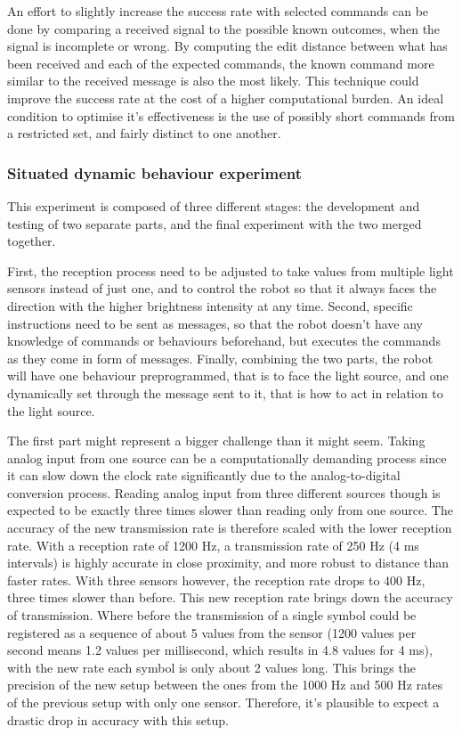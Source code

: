 An effort to slightly increase the success rate with selected commands can be done by comparing a received signal to the possible known outcomes, when the signal is incomplete or wrong.
By computing the edit distance between what has been received and each of the expected commands, the known command more similar to the received message is also the most likely.
This technique could improve the success rate at the cost of a higher computational burden.
An ideal condition to optimise it's effectiveness is the use of possibly short commands from a restricted set, and fairly distinct to one another.

\subsubsection{Situated dynamic behaviour experiment}
This experiment is composed of three different stages: the development and testing of two separate parts, and the final experiment with the two merged together.

First, the reception process need to be adjusted to take values from multiple light sensors instead of just one, and to control the robot so that it always faces the direction with the higher brightness intensity at any time.
Second, specific instructions need to be sent as messages, so that the robot doesn't have any knowledge of commands or behaviours beforehand, but executes the commands as they come in form of messages.
Finally, combining the two parts, the robot will have one behaviour preprogrammed, that is to face the light source, and one dynamically set through the message sent to it, that is how to act in relation to the light source.

The first part might represent a bigger challenge than it might seem.
Taking analog input from one source can be a computationally demanding process since it can slow down the clock rate significantly due to the analog-to-digital conversion process.
Reading analog input from three different sources though is expected to be exactly three times slower than reading only from one source.
The accuracy of the new transmission rate is therefore scaled with the lower reception rate.
With a reception rate of 1200 Hz, a transmission rate of 250 Hz (4 ms intervals) is highly accurate in close proximity, and more robust to distance than faster rates.
With three sensors however, the reception rate drops to 400 Hz, three times slower than before.
This new reception rate brings down the accuracy of transmission.
Where before the transmission of a single symbol could be registered as a sequence of about 5 values from the sensor (1200 values per second means 1.2 values per millisecond, which results in 4.8 values for 4 ms), with the new rate each symbol is only about 2 values long.
This brings the precision of the new setup between the ones from the 1000 Hz and 500 Hz rates of the previous setup with only one sensor.
Therefore, it's plausible to expect a drastic drop in accuracy with this setup.

